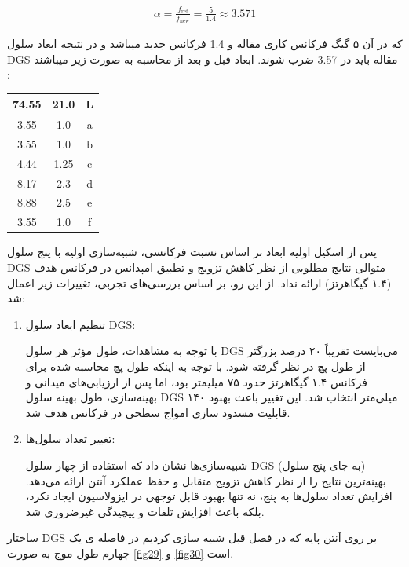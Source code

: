   \begin{align}
 	\label{eq:eq13}
 	\alpha = \frac{f_{\text{ref}}}{f_{\text{new}}} = \frac{5}{1.4} \approx 3.571
 \end{align}
 
 که در آن ۵ گیگ فرکانس کاری مقاله و 1.4 فرکانس جدید میباشد و در نتیجه ابعاد سلول DGS مقاله باید در 3.57 ضرب شوند.
 ابعاد قبل و بعد از محاسبه به صورت زیر میباشند : 
 \begin{center}
 \begin{tabular}{|c|c|c|}
 	\hline
 	74.55 & 21.0 & L \\
 	\hline
 	3.55 & 1.0 & a \\
 	\hline
 	3.55 & 1.0 & b \\
 	\hline
 	4.44 & 1.25 & c \\
 	\hline
 	8.17 & 2.3 & d \\
 	\hline
 	8.88 & 2.5 & e \\
 	\hline
 	3.55 & 1.0 & f \\
 	\hline
 \end{tabular}
 \end{center}
 
پس از اسکیل اولیه ابعاد بر اساس نسبت فرکانسی، شبیه‌سازی اولیه با پنج سلول DGS متوالی نتایج مطلوبی از نظر کاهش تزویج و تطبیق امپدانس در فرکانس هدف (۱.۴ گیگاهرتز) ارائه نداد. از این رو، بر اساس بررسی‌های تجربی، تغییرات زیر اعمال شد:
 \begin{enumerate}
 	\item{
 		تنظیم ابعاد سلول DGS:
 		
 		با توجه به مشاهدات، طول مؤثر هر سلول DGS می‌بایست تقریباً ۲۰ درصد بزرگتر از طول پچ  در نظر گرفته شود. با توجه به اینکه طول پچ محاسبه شده برای فرکانس ۱.۴ گیگاهرتز حدود ۷۵ میلیمتر بود، اما پس از ارزیابی‌های میدانی و بهینه‌سازی، طول بهینه سلول DGS ۱۴۰ میلی‌متر انتخاب شد. این تغییر باعث بهبود قابلیت مسدود سازی امواج سطحی در فرکانس هدف شد.
 		}
 	\item{
 	تغییر تعداد سلول‌ها:
 	
 	شبیه‌سازی‌ها نشان داد که استفاده از چهار سلول DGS (به جای پنج سلول) بهینه‌ترین نتایج را از نظر کاهش تزویج متقابل و حفظ عملکرد آنتن ارائه می‌دهد. افزایش تعداد سلول‌ها به پنج، نه تنها بهبود قابل توجهی در ایزولاسیون ایجاد نکرد، بلکه باعث افزایش تلفات و پیچیدگی غیرضروری شد.
 	}
 \end{enumerate}
 
 ساختار DGS بر روی آنتن پایه که در فصل قبل شبیه سازی کردیم در فاصله ی یک چهارم طول موج به صورت 
 \ref{fig29}
 و
 \ref{fig30}
  است.
  
